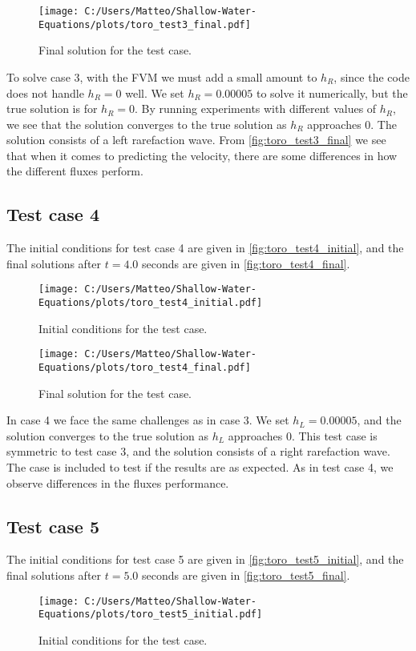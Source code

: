 \begin{figure}[H]
    \centering
    \texttt{[image: C:/Users/Matteo/Shallow-Water-Equations/plots/toro\_test3\_final.pdf]}
    \caption{Final solution for the test case.}\label{fig:toro_test3_final}
\end{figure}
To solve case 3, with the FVM we must add a small amount to $h_R$, since the code does not handle $h_R = 0$ well.
We set $h_R = 0.00005$ to solve it numerically, but the true solution is for $h_R = 0$.
By running experiments with different values of $h_R$, we see that the solution converges to the true solution as $h_R$ approaches 0.
The solution consists of a left rarefaction wave.
From \autoref{fig:toro_test3_final} we see that when it comes to predicting the velocity, there are some differences in how the different fluxes perform.

\subsection*{Test case 4}
The initial conditions for test case 4 are given in \autoref{fig:toro_test4_initial}, and the final solutions after $t=4.0$ seconds are given in \autoref{fig:toro_test4_final}.
\begin{figure}[H]
    \centering
    \texttt{[image: C:/Users/Matteo/Shallow-Water-Equations/plots/toro\_test4\_initial.pdf]}
    \caption{Initial conditions for the test case.}\label{fig:toro_test4_initial}
\end{figure}

\begin{figure}[H]
    \centering
    \texttt{[image: C:/Users/Matteo/Shallow-Water-Equations/plots/toro\_test4\_final.pdf]}
    \caption{Final solution for the test case.}\label{fig:toro_test4_final}
\end{figure}
In case 4 we face the same challenges as in case 3.
We set $h_L = 0.00005$, and the solution converges to the true solution as $h_L$ approaches 0.
This test case is symmetric to test case 3, and the solution consists of a right rarefaction wave.
The case is included to test if the results are as expected.
As in test case 4, we observe differences in the fluxes performance.

\subsection*{Test case 5}
The initial conditions for test case 5 are given in \autoref{fig:toro_test5_initial}, and the final solutions after $t=5.0$ seconds are given in \autoref{fig:toro_test5_final}.
\begin{figure}[H]
    \centering
    \texttt{[image: C:/Users/Matteo/Shallow-Water-Equations/plots/toro\_test5\_initial.pdf]}
    \caption{Initial conditions for the test case.}\label{fig:toro_test5_initial}
\end{figure}

